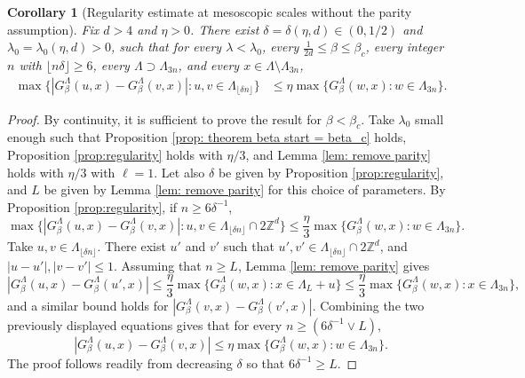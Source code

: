 \documentclass[11pt,a4paper]{article}
\numberwithin{equation}{section}
\theoremstyle{plain}
\newtheorem{Cor}[Thm]{Corollary}
\theoremstyle{definition}
\begin{document}
\begin{Cor}[Regularity estimate at mesoscopic scales without the parity assumption]\label{cor: improved reg parity-wise}	Fix $d>4$ and $\eta>0$. There exist $\delta=\delta(\eta,d)\in(0,1/2)$ and $\lambda_0=\lambda_0(\eta,d)>0$, such that for every $\lambda<\lambda_0$, every $\tfrac{1}{2d}\le\beta\leq \beta_c$, every integer $n$ with $\lfloor n\delta\rfloor\geq 6$, every $\Lambda\supset \Lambda_{3n}$, and every $x\in \Lambda\setminus\Lambda_{3n}$, 
\begin{align}
\max\big\{|G_\beta^\Lambda(u,x)-G_\beta^\Lambda(v,x)|:u,v\in\Lambda_{\lfloor\delta n \rfloor}\big\}&\le \eta\max\big\{G_\beta^\Lambda(w,x):w\in \Lambda_{3n}\big\}.
\end{align}
\end{Cor}
\begin{proof} By continuity, it is sufficient to prove the result for $\beta<\beta_c$.
Take $\lambda_0$ small enough such that Proposition \ref{prop: theorem beta start = beta_c} holds, Proposition \ref{prop:regularity} holds with $\eta/3$, and Lemma \ref{lem: remove parity} holds with $\eta/3$ with $\ell=1$. Let also $\delta$ be given by Proposition \ref{prop:regularity}, and $L$ be given by Lemma \ref{lem: remove parity} for this choice of parameters. By Proposition \ref{prop:regularity}, if $n\geq 6\delta^{-1}$,
\begin{equation}
	\max\big\{|G_\beta^\Lambda(u,x)-G_\beta^\Lambda(v,x)|:u,v\in\Lambda_{\lfloor\delta n\rfloor}\cap 2\mathbb Z^d\big\}\le \frac{\eta}{3}\max\big\{G_\beta^\Lambda(w,x):w\in \Lambda_{3n}\big\}.
\end{equation}
Take $u,v\in \Lambda_{\lfloor \delta n\rfloor}$. There exist $u'$ and $v'$ such that $u',v'\in \Lambda_{\lfloor\delta n\rfloor}\cap 2\mathbb Z^d$, and $|u-u'|,|v-v'|\leq 1$. Assuming that $n\geq L$, Lemma \ref{lem: remove parity} gives
\begin{equation}
	|G_\beta^{\Lambda}(u,x)-G_\beta^{\Lambda}(u',x)|\leq \frac{\eta}{3}\max\{G_\beta^\Lambda(w,x):x\in \Lambda_L+u\}\leq \frac{\eta}{3}\max\{G_\beta^\Lambda(w,x):x\in \Lambda_{3n}\},
\end{equation}
and a similar bound holds for $|G_\beta^{\Lambda}(v,x)-G_\beta^{\Lambda}(v',x)|$. 
Combining the two previously displayed equations gives that for every $n\geq (6\delta^{-1}\vee L)$,
\begin{equation}
	|G_\beta^\Lambda(u,x)-G_\beta^\Lambda(v,x)|\leq \eta \max\{G_\beta^{\Lambda}(w,x):w\in \Lambda_{3n}\}.
\end{equation}
The proof follows readily from decreasing $\delta$ so that $6\delta^{-1}\geq L$.
	\end{proof}
\end{document}
